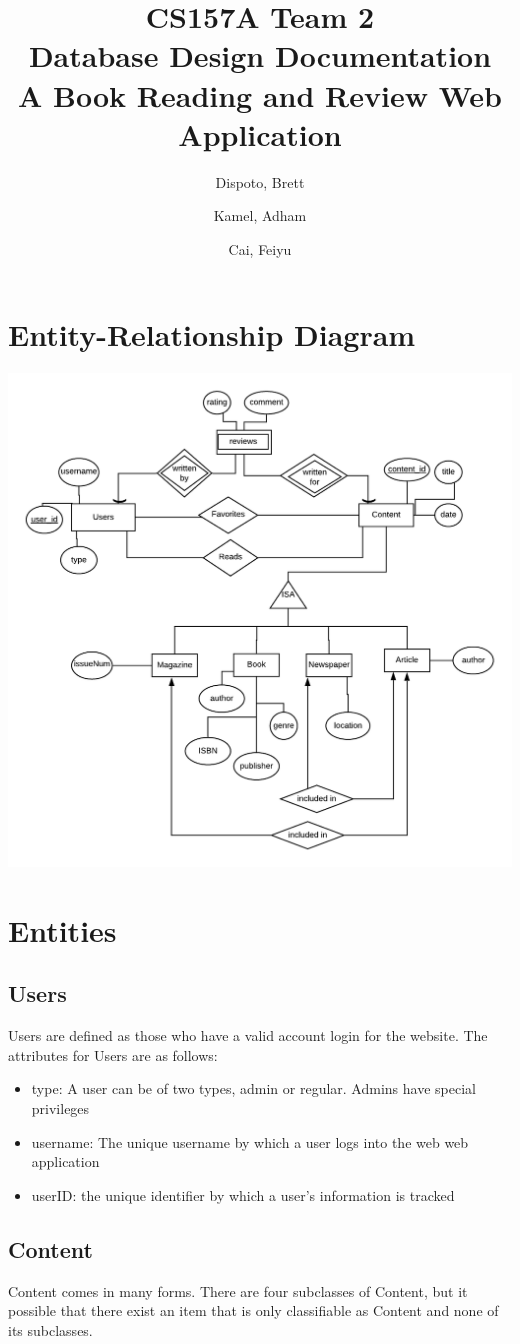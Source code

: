 \documentclass[letter, 12pt, titlepage]{article}
\author{
	Dispoto, Brett\\
        \and
        Kamel, Adham\\
        \and
        Cai, Feiyu\\
}
\title{CS157A Team 2 \\ Database Design Documentation \\
        \large A Book Reading and Review Web Application}
\begin{document}
  \maketitle
  	\section{Entity-Relationship Diagram}
	\includegraphics[scale=1]{erd.png}
	\section{Entities}
		\subsection{Users}
			Users are defined as those who have a valid account login for the website.
			The attributes for Users are as follows:
			\begin{itemize}
				\item type: A user can be of two types, admin or regular. Admins have special privileges
				\item username: The unique username by which a user logs into the web web application
				\item userID: the unique identifier by which a user's information is tracked
			\end{itemize}
		\subsection{Content}
				Content comes in many forms. There are four subclasses of Content, but it possible that there exist an item that is only classifiable as Content and none of its subclasses. 
			
\end{document}
